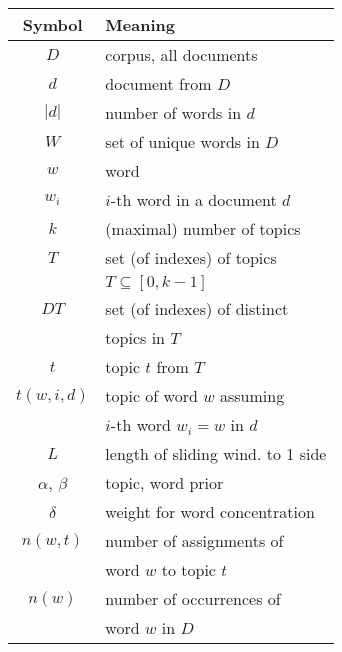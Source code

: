 \documentclass[twocolumn,10]{article}
\begin{document}
	\begin{figure*}
		\noindent\begin{minipage}[b]{0.35\textwidth}	
			\small
			\setlength\tabcolsep{3pt}
			\begin{tabular}{| c | l |}
				\hline			
				Symbol & Meaning \\ \hline
				$D$ & corpus, all documents\\
				$d$ & document from $D$\\
				$|d|$ & number of words in $d$\\
				$W$ & set of unique words in $D$\\
				$w$ & word\\
				$w_i$ & $i$-th word in a document $d$ \\
				$k$ & (maximal) number of topics\\
				$T$ & set (of indexes) of topics \\ 
				& $T \subseteq [0,k-1]$\\
				$DT$ & set (of indexes) of distinct \\
				&topics in $T$\\
				$t$ & topic $t$ from $T$\\
				$t(w,i,d)$ & topic of word $w$ assuming\\
						& $i$-th word $w_i=w$ in $d$ \\
				$L$ & length of sliding wind. to 1 side\\ 
				$\alpha$, $\beta$ & topic, word prior\\
				$\delta$ & weight for word concentration  \\
				$n(w,t)$ & number of assignments of\\
				& word $w$ to topic $t$\\
				$n(w)$ & number of occurrences of \\
				& word $w$ in $D$\\  \hline
			\end{tabular}
			\label{tab:not}
		\end{minipage}\qquad 
		\vspace{-10pt}
		\begin{minipage}[b]{0.6\textwidth}
			

\end{minipage}
\end{figure*}
\end{document}
